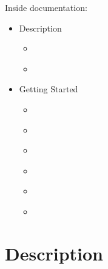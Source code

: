 \documentclass[letterpaper,10pt,english]{jupyterBook}
\begin{document}
\sphinxAtStartPar
Inside documentation:
\begin{itemize}
\item {} 
\sphinxAtStartPar
Description

\begin{itemize}
\item {} 
\sphinxAtStartPar
{\hyperref[\detokenize{chapters/theory::doc}]{}}

\item {} 
\sphinxAtStartPar
{\hyperref[\detokenize{chapters/technology::doc}]{}}

\end{itemize}
\end{itemize}
\begin{itemize}
\item {} 
\sphinxAtStartPar
Getting Started

\begin{itemize}
\item {} 
\sphinxAtStartPar
{\hyperref[\detokenize{chapters/installation::doc}]{}}

\item {} 
\sphinxAtStartPar
{\hyperref[\detokenize{chapters/usage::doc}]{}}

\item {} 
\sphinxAtStartPar
{\hyperref[\detokenize{chapters/examples::doc}]{}}

\item {} 
\sphinxAtStartPar
{\hyperref[\detokenize{chapters/validation::doc}]{}}

\item {} 
\sphinxAtStartPar
{\hyperref[\detokenize{chapters/notebooks::doc}]{}}

\item {} 
\sphinxAtStartPar
{\hyperref[\detokenize{chapters/bibliography::doc}]{}}

\end{itemize}
\end{itemize}

\sphinxstepscope


\part{Description}

\sphinxstepscope
\end{document}
